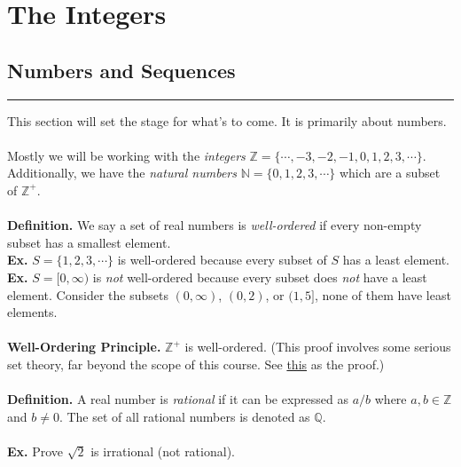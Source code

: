 \documentclass[class=article, crop=false]{standalone}
\begin{document}
    
\section{The Integers}

\subsection{Numbers and Sequences}
\rule{\textwidth}{1pt}
This section will set the stage for what's to come. It is primarily about numbers.\\\\
Mostly we will be working with the \emph{integers} $\mathbb{Z} = \{\cdots, -3,-2,-1,0,1,2,3,\cdots\}$.
Additionally, we have the \emph{natural numbers} $\mathbb{N} = \{0,1,2,3,\cdots\}$ which are a subset of $\mathbb{Z}^+$.\\\\
\textbf{Definition.} We say a set of real numbers is \emph{well-ordered} if every non-empty subset has a smallest element.\\
\textbf{Ex.} $S = \{1,2,3,\cdots\}$ is well-ordered because every subset of $S$ has a least element.\\
\textbf{Ex.} $S = [0, \infty)$ is \emph{not} well-ordered because every subset does \emph{not} have a least element. 
Consider the subsets $(0,\infty)$, $(0,2)$, or $(1,5]$, none of them have least elements.\\\\
\textbf{Well-Ordering Principle.} $\mathbb{Z}^+$ is well-ordered. (This proof involves some serious set theory,
far beyond the scope of this course. See \href{https://math.berkeley.edu/~kpmann/Well-ordering.pdf}{this} as the proof.)\\\\
\textbf{Definition.} A real number is \emph{rational} if it can be expressed as $a/b$ where $a,b\in\mathbb{Z}$ and $b\neq 0$.
The set of all rational numbers is denoted as $\mathbb{Q}$.\\\\
\textbf{Ex.} Prove $\sqrt{2}$ is irrational (not rational).
\end{document}
